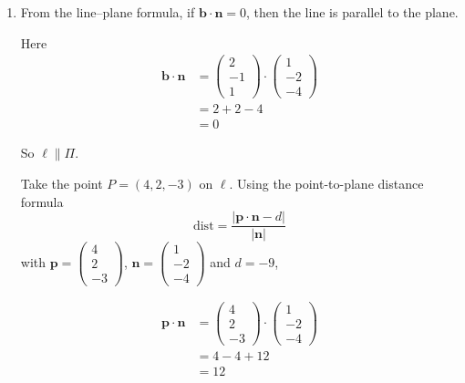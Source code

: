 \documentclass[leqno]{article}
\begin{document}
\begin{enumerate}[
  label=\textbf{\arabic*.},
  leftmargin=*,
  topsep=0pt,
  partopsep=0pt,
  parsep=0pt
]
\begin{tcolorbox}[colback=white, colframe=scarlet, title={\textbf{Solution}}, breakable, grow to left by=6mm, grow to right by=10mm]
\begin{enumerate}[label=\textbf{(\roman*)}]
Hence the plane is
\[
\mathbf r\cdot \begin{pmatrix}1\\-2\\-4\end{pmatrix}=-9
\]

So an equation of \(\Pi\) is
\[
\mathbf r\cdot \begin{pmatrix}1\\-2\\-4\end{pmatrix}=-9
\]

  \item From the line--plane formula, if \(\mathbf b\cdot \mathbf n=0\), then the line is parallel to the plane.

Here
\begin{align*}
\mathbf b\cdot \mathbf n&=\begin{pmatrix}2\\-1\\1\end{pmatrix}\cdot \begin{pmatrix}1\\-2\\-4\end{pmatrix} \\
&=2+2-4 \\
&=0
\end{align*}

So \(\ell\parallel \Pi\).

Take the point \(P=(4,2,-3)\) on \(\ell\). Using the point-to-plane distance formula
\[
\mathrm{dist}=\frac{|\mathbf p\cdot \mathbf n-d|}{|\mathbf n|}
\]
with \(\mathbf p=\begin{pmatrix}4\\2\\-3\end{pmatrix}\), \(\mathbf n=\begin{pmatrix}1\\-2\\-4\end{pmatrix}\) and \(d=-9\),

\begin{align*}
\mathbf p\cdot \mathbf n&=\begin{pmatrix}4\\2\\-3\end{pmatrix}\cdot \begin{pmatrix}1\\-2\\-4\end{pmatrix} \\
&=4-4+12 \\
&=12
\end{align*}


\end{enumerate}
\end{tcolorbox}
\end{enumerate}
\end{document}
